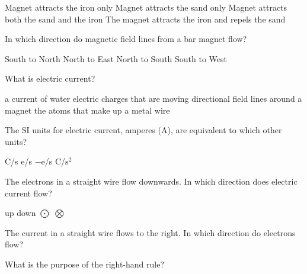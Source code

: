 \documentclass[]{exam}
\begin{document}
\begin{questions}
\begin{randomizechoices}
\CorrectChoice Magnet attracts the iron only
\choice Magnet attracts the sand only
\choice Magnet attracts both the sand and the iron
\choice The magnet attracts the iron and repels the sand
\end{randomizechoices}

\question
In which direction do magnetic field lines from a bar magnet flow?

\begin{randomizechoices}
\choice South to North
\choice North to East
\CorrectChoice North to South
\choice South to West
\end{randomizechoices}

\question
What is electric current?

\begin{randomizechoices}
\choice a current of water
\CorrectChoice electric charges that are moving
\choice directional field lines around a magnet
\choice the atoms that make up a metal wire
\end{randomizechoices}

\question
The SI units for electric current, amperes (A), are equivalent to which other units?

\begin{randomizechoices}
\CorrectChoice C/s
\choice e/s
\choice $-$e/s
\choice C/$\mathrm{s^2}$
\end{randomizechoices}

\question
The electrons in a straight wire flow downwards. In which direction does electric current flow?

\begin{randomizeoneparchoices}
\CorrectChoice up
\choice down
\choice $\bigodot$
\choice $\bigotimes$
\end{randomizeoneparchoices}

\question
The current in a straight wire flows to the right. In which direction do electrons flow?

\question
What is the purpose of the right-hand rule?


\end{questions}
\end{document}
